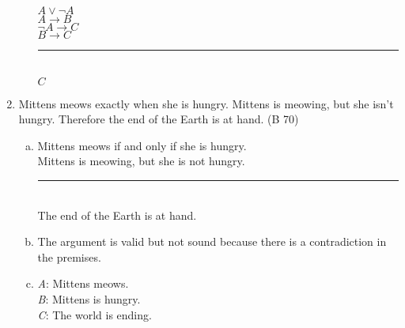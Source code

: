 \documentclass{article}
\begin{document}
\begin{enumerate}
\begin{enumerate}[(a)]
                    $A \lor \neg A$\\
                    $A \to B$\\
                    $\neg A \to C$\\
                    $B \to C$\\
                    \rule{5em}{.5pt}\\
                    $C$
          \end{enumerate}
    \item Mittens meows exactly when she is hungry. Mittens is meowing, but she isn't hungry. Therefore the end of the Earth is at hand. (B 70)
          \begin{enumerate}[(a)]
              \item Mittens meows if and only if she is hungry.\\
                    Mittens is meowing, but she is not hungry.\\
                    \rule{15em}{.5pt}\\
                    The end of the Earth is at hand.
              \item The argument is valid but not sound because there is a contradiction in the premises.
              \item \textit{A}: Mittens meows.\\
                    \textit{B}: Mittens is hungry.\\
                    \textit{C}: The world is ending.\\


\end{enumerate}
\end{enumerate}
\end{document}
